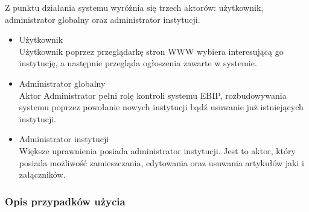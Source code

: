 \documentclass{article}
\begin{document}
	Z punktu działania systemu wyróżnia się trzech aktorów:  użytkownik, administrator globalny oraz administrator instytucji.
\begin{itemize} 
	\item Użytkownik	
	\\Użytkownik poprzez przeglądarkę stron WWW wybiera interesującą go instytucję, a następnie przegląda ogłoszenia zawarte w systemie.
	\item Administrator globalny	
	\\Aktor Administrator pełni rolę kontroli systemu EBIP, rozbudowywania systemu poprzez powołanie nowych instytucji bądź usuwanie już istniejących instytucji.
	\item Administrator instytucji	
	\\Większe uprawnienia posiada administrator instytucji. Jest to aktor, który posiada możliwość zamieszczania, edytowania oraz usuwania artykułów jaki i załączników.
\end{itemize}
\subsubsection{Opis przypadków użycia}
	
\end{document}
